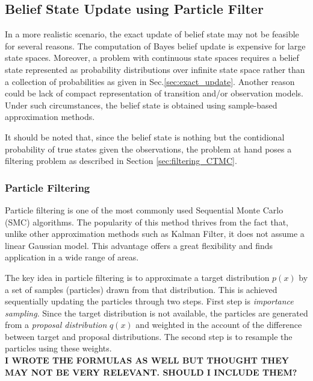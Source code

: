 \subsection{Belief State Update using Particle Filter}
\label{sec:particle_filter}
In a more realistic scenario, the exact update of belief state may not be feasible for several reasons. The computation of Bayes belief update is expensive for large state spaces. Moreover, a problem with continuous state spaces requires a belief state represented as probability distributions over infinite state space rather than a collection of probabilities as given in Sec.\ref{sec:exact_update}. \cite{Carlo1904} Another reason could be lack of compact representation of transition and/or observation models. Under such circumstances, the belief state is obtained using sample-based approximation methods. \cite{Carlo1904} 

It should be noted that, since the belief state is nothing but the contidional probability of true states given the observations, the problem at hand poses a filtering problem as described in Section \ref{sec:filtering_CTMC}.

\subsubsection{Particle Filtering}
Particle filtering is one of the most commonly used Sequential Monte Carlo (SMC) algorithms. The popularity of this method thrives from the fact that, unlike other approximation methods such as Kalman Filter, it does not assume a linear Gaussian model. This advantage offers a great flexibility and finds application in a wide range of areas.\cite{Doucet2009}

The key idea in particle filtering is to approximate a target distribution $ p(x) $ by a set of samples (particles) drawn from that distribution. This is achieved sequentially updating the particles through two steps. First step is \textit{importance sampling}. Since the target distribution is not available, the particles are generated from a \textit{proposal distribution} $ q(x) $ and weighted in the account of the difference between target and proposal distributions. The second step is to resample the particles using these weights. \cite{Godsill2019} \\
\textbf{I WROTE THE FORMULAS AS WELL BUT THOUGHT THEY MAY NOT BE VERY RELEVANT. SHOULD I INCLUDE THEM?}

